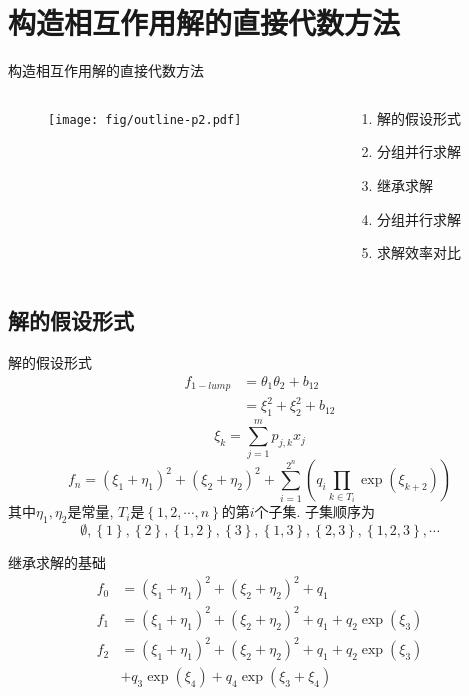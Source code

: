 \documentclass{beamer}
\newcommand{\sbrace}[1]{\left(#1\right)}
\newcommand{\bbrace}[1]{\left\{#1\right\}}
\begin{document}
\section{构造相互作用解的直接代数方法}
\begin{frame}{构造相互作用解的直接代数方法}
\begin{columns}
\begin{column}{0.5\textwidth}
  \begin{figure}
    \centering
    \texttt{[image: fig/outline-p2.pdf]}
  \end{figure}
\end{column}
\begin{column}{0.5\textwidth}
  \begin{enumerate}
  \item 解的假设形式
  \item 分组并行求解
  \item 继承求解
  \item 分组并行求解
  \item 求解效率对比
  \end{enumerate}
\end{column}
\end{columns}
\end{frame}

\subsection{解的假设形式}
\begin{frame}{解的假设形式}
\begin{equation}
\begin{aligned}
f_{1-lump}&=\theta_1\theta_2+b_{12} \\
&=\xi_1^2+\xi_2^2+b_{12}
\end{aligned} 
\end{equation}
\begin{equation}
  \xi_k=\sum_{j=1}^m{p_{j,k}x_j}
\end{equation}
\begin{equation}
  f_{n}=\sbrace{\xi_1+\eta_1}^2+\sbrace{\xi_2+\eta_2}^2+\sum_{i=1}^{2^n}\sbrace {q_i\prod_{k \in T_i}{\exp(\xi_{k+2})}}
\end{equation}
其中$\eta_1,\eta_2$是常量, $T_i$是$\bbrace{1,2,\cdots,n}$的第$i$个子集. 子集顺序为
\[
    \emptyset,\bbrace{1},\bbrace{2},\bbrace{1,2},\bbrace{3},\bbrace{1,3},\bbrace{2,3},\bbrace{1,2,3},\cdots 
\]
\end{frame}

\begin{frame}{继承求解的基础}
\begin{equation}
\begin{aligned}
    f_0 &= \sbrace{\xi_1+\eta_1}^2+\sbrace{\xi_2+\eta_2}^2+q_1\\ 
    f_1 &= \sbrace{\xi_1+\eta_1}^2+\sbrace{\xi_2+\eta_2}^2+q_1+q_2 \exp(\xi_3) \\ 
    f_2 &= \sbrace{\xi_1+\eta_1}^2+\sbrace{\xi_2+\eta_2}^2+q_1+q_2 \exp(\xi_3) \\
        & +q_3 \exp(\xi_4) + q_4 \exp(\xi_3+\xi_4)
\end{aligned}
\end{equation}
\end{frame}
\end{document}
